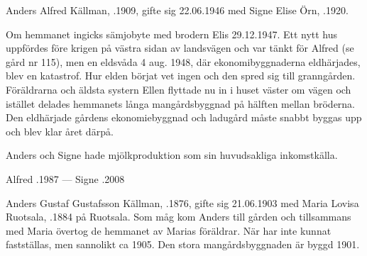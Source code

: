 Anders Alfred Källman, .1909, gifte sig 22.06.1946 med Signe Elise Örn, .1920.

Om hemmanet ingicks sämjobyte med brodern Elis 29.12.1947. Ett nytt hus uppfördes före krigen på västra sidan av landsvägen och var tänkt för Alfred (se gård nr 115), men en eldsvåda 4 aug. 1948, där ekonomibyggnaderna eldhärjades, blev en katastrof. Hur elden börjat vet ingen och den spred sig till granngården. Föräldrarna och äldsta systern Ellen flyttade nu in i huset väster om vägen och istället delades hemmanets långa mangårdsbyggnad på hälften mellan bröderna. Den eldhärjade gårdens ekonomiebyggnad och ladugård måste snabbt byggas upp och blev klar året därpå.

Anders och Signe hade mjölkproduktion som sin huvudsakliga inkomstkälla.
\begin{jhchildren}
  \item {}
  \item {}
\end{jhchildren}

Alfred .1987  ---  Signe .2008


Anders Gustaf Gustafsson Källman, .1876, gifte sig 21.06.1903 med Maria Lovisa Ruotsala, .1884 på Ruotsala. Som måg kom Anders till gården och tillsammans med Maria övertog de hemmanet av Marias föräldrar. När har inte kunnat fastställas, men sannolikt ca 1905. Den stora mangårdsbyggnaden är byggd 1901.
\begin{jhchildren}
  \item {}
  \item {}
  \item {}
  \item {}
  \item {}
  \item {}
  \item {}
\end{jhchildren}

